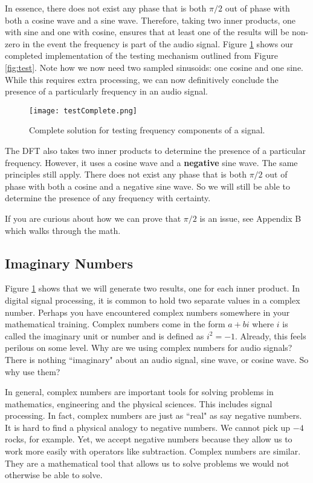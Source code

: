 In essence, there does not exist any phase that is both $\pi/2$ out of phase with
both a cosine wave and a sine wave.  Therefore, taking two inner
products, one with sine and one with cosine,  ensures that at least one of the results will be non-zero in the
event the frequency is part of the audio signal.  Figure \ref{fig:testComplete} shows our completed implementation 
of the testing mechanism outlined from
Figure \ref{fig:test}.  Note how we now need two sampled sinusoids: one cosine and one sine.  While this
requires extra processing, we can now definitively conclude the presence of a particularly frequency in an 
audio signal.

\begin{figure}[h]
	\caption{Complete solution for testing frequency components of a signal.}
	\centering
	\texttt{[image: testComplete.png]}
	\label{fig:testComplete}
\end{figure}

The DFT also takes two inner products to determine the presence of a particular frequency.  However, it uses
a cosine wave and a \textbf{negative} sine wave.  The same principles still apply.  There does not exist any
phase that is both $\pi/2$ out of phase with both a cosine and a negative sine wave.  So we will still be able 
to determine the presence of any frequency with certainty.

If you are curious about how we can prove that $\pi/2$ is an issue, see Appendix B which walks through the math.

\subsection*{Imaginary Numbers}

Figure \ref{fig:testComplete} shows that we will generate two results, one for
each inner product.  In digital signal processing, it is common to hold two separate values in a complex number.  
Perhaps you have encountered complex numbers somewhere in your mathematical training.  Complex numbers
come in the form $a + bi$ where $i$ is called the imaginary unit or number and is defined as $i^2 = -1$.  Already,
this feels perilous on some level.  Why are we using complex numbers for audio signals?  There is nothing
``imaginary" about an audio signal, sine wave, or cosine wave.  So why use them?

In general, complex numbers are important  tools for solving problems in mathematics, engineering and
the physical sciences.  This includes signal processing.  In fact, complex numbers are just as 
``real" as say negative numbers.
It is hard to find a physical analogy to negative numbers.  We cannot pick up $-4$ rocks, for example.  Yet, we 
accept negative numbers because they allow us to work more easily with operators like subtraction.  Complex
numbers are similar.  They are a mathematical tool that allows us to solve problems we would not otherwise be
able to solve.   

